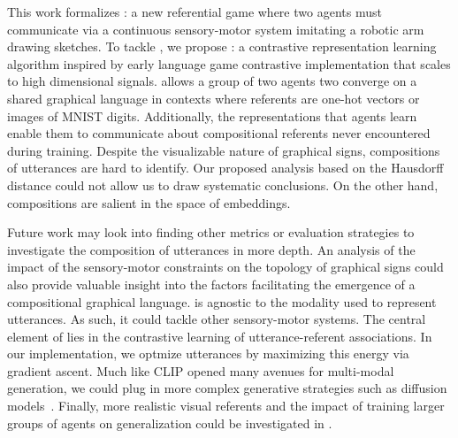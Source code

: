 This work formalizes \greg: a new referential game where two agents must communicate via a continuous sensory-motor system imitating a robotic arm drawing sketches. To tackle \greg, we propose \curves: a contrastive representation learning algorithm inspired by early language game contrastive implementation that scales to high dimensional signals. \curves allows a group of two agents two converge on a shared graphical language in contexts where referents are one-hot vectors or images of MNIST digits. Additionally, the representations that agents learn enable them to communicate about compositional referents never encountered during training. Despite the visualizable nature of graphical signs, compositions of utterances are hard to identify. Our proposed analysis based on the Hausdorff distance could not allow us to draw systematic conclusions. On the other hand, compositions are salient in the space of embeddings.

Future work may look into finding other metrics or evaluation strategies to investigate the composition of utterances in more depth. An analysis of the impact of the sensory-motor constraints on the topology of graphical signs could also provide valuable insight into the factors facilitating the emergence of a compositional graphical language. \curves is agnostic to the modality used to represent utterances. As such, it could tackle other sensory-motor systems.  The central element of \curves lies in the contrastive learning of utterance-referent associations. In our implementation, we optmize utterances by maximizing this energy via gradient ascent. Much like CLIP opened many avenues for multi-modal generation, we could plug in more complex generative strategies such as diffusion models~\citep{Rombach2021HighResolutionIS,Saharia2022PhotorealisticTD}. Finally, more realistic visual referents and the impact of training larger groups of agents on generalization could be investigated in \greg.
